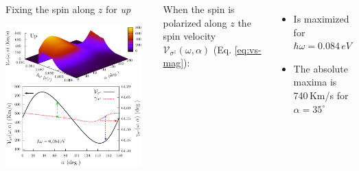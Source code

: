 \documentclass{beamer}
\begin{document}
\begin{frame}

\begin{columns}


\begin{center}

Fixing the spin along $z$ for \emph{up}

\vspace{2mm}

\includegraphics[width=0.95\textwidth]{figs/fig4.pdf}

\end{center}  



{ When the spin is polarized along $z$ the spin velocity
$\mathcal{V}_{\sigma^{z}}(\omega,\alpha)$ (Eq. \ref{eq:vs-mag}):}


\vspace{-2mm}

{\small

\begin{itemize}

\item 
Is maximized for $\hbar \omega = 0.084\,eV$

\vspace{-1mm}
\item 
The absolute maxima is 740\,Km/s for $\alpha = 35^{\circ}$


\end{itemize}}
\end{columns}
\end{frame}
\end{document}
